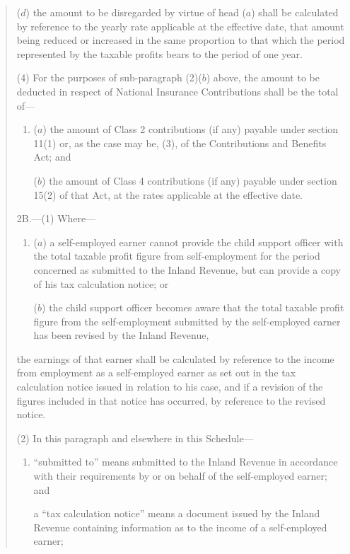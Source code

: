 \documentclass[12pt,a4paper]{article}
\begin{document}
\begin{enumerate}
\begin{quotation}
\begin{enumerate}
($d$) the amount to be disregarded by virtue of head ($a$) shall be calculated by reference to the yearly rate applicable at the effective date, that amount being reduced or increased in the same proportion to that which the period represented by the taxable profits bears to the period of one year.
\end{enumerate}

(4) For the purposes of sub-paragraph (2)($b$) above, the amount to be deducted in respect of National Insurance Contributions shall be the total of—
\begin{enumerate}\item[]
($a$) the amount of Class 2 contributions (if any) payable under section 11(1) or, as the case may be, (3), of the Contributions and Benefits Act; and

($b$) the amount of Class 4 contributions (if any) payable under section 15(2) of that Act,
at the rates applicable at the effective date.
\end{enumerate}

\medskip

2B.—(1) Where—
\begin{enumerate}\item[]
($a$) a self-employed earner cannot provide the child support officer with the total taxable profit figure from self-employment for the period concerned as submitted to the Inland Revenue, but can provide a copy of his tax calculation notice; or

($b$) the child support officer becomes aware that the total taxable profit figure from the self-employment submitted by the self-employed earner has been revised by the Inland Revenue,
\end{enumerate}
the earnings of that earner shall be calculated by reference to the income from employment as a self-employed earner as set out in the tax calculation notice issued in relation to his case, and if a revision of the figures included in that notice has occurred, by reference to the revised notice.

(2) In this paragraph and elsewhere in this Schedule—
\begin{enumerate}\item[]
“submitted to” means submitted to the Inland Revenue in accordance with their requirements by or on behalf of the self-employed earner; and

a “tax calculation notice” means a document issued by the Inland Revenue containing information as to the income of a self-employed earner;


\end{enumerate}
\end{quotation}
\end{enumerate}
\end{document}
